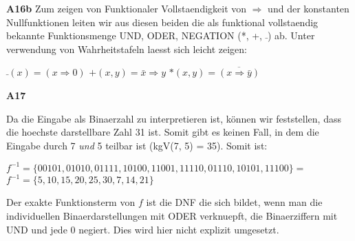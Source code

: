 \documentclass{article}
\begin{document}
\begin{flushleft}
\textbf{A16b} \linebreak
Zum zeigen von Funktionaler Vollstaendigkeit von $\Rightarrow$ und der konstanten Nullfunktionen leiten wir aus diesen beiden die als funktional vollstaendig bekannte Funktionsmenge UND, ODER, NEGATION (*, +, $\bar{ }$) ab. \linebreak
Unter verwendung von Wahrheitstafeln laesst sich leicht zeigen:

$\bar{ }(x) = (x \Rightarrow 0 )$\linebreak
$+(x, y) = \bar{x} \Rightarrow y$\linebreak
$*(x, y) = \overline{(x \Rightarrow \bar{y})}$\linebreak

\end{flushleft}
\pagebreak
\begin{flushleft}
\textbf{A17} \linebreak

Da die Eingabe als Binaerzahl zu interpretieren ist, können wir feststellen, dass die hoechste darstellbare Zahl 31 ist. Somit gibt es keinen Fall, in dem die Eingabe durch 7 \textit{und} 5 teilbar ist (kgV(7, 5) = 35). Somit ist:

$f^{-1} = \{00101, 01010, 01111, 10100, 11001, 11110, 01110, 10101, 11100 \} = $
$f^{-1} = \{ 5, 10, 15, 20, 25, 30, 7, 14, 21 \}$

Der exakte Funktionsterm von $f$ ist die DNF die sich bildet, wenn man die individuellen Binaerdarstellungen mit ODER verknuepft, die Binaerziffern mit UND und jede 0 negiert. Dies wird hier nicht explizit umgesetzt.

\end{flushleft}
\end{document}
